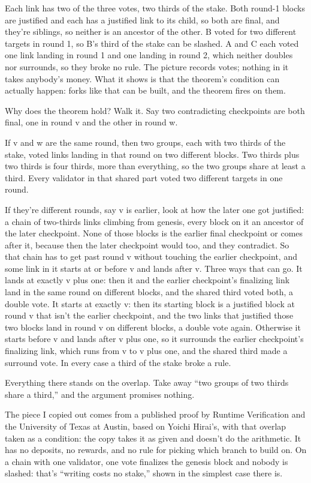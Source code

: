 \documentclass[11pt,twoside]{article}
\theoremstyle{thielethm}
\theoremstyle{thieledef}
\theoremstyle{thieledef}
\theoremstyle{thieledef}
\theoremstyle{thielethm}
\theoremstyle{thieleobs}
\theoremstyle{thielethm}
\begin{document}
Each link has two of the three votes, two thirds of the stake. Both round-1 blocks are justified and each has a justified link to its child, so both are final, and they're siblings, so neither is an ancestor of the other. B voted for two different targets in round 1, so B's third of the stake can be slashed. A and C each voted one link landing in round 1 and one landing in round 2, which neither doubles nor surrounds, so they broke no rule. The picture records votes; nothing in it takes anybody's money. What it shows is that the theorem's condition can actually happen: forks like that can be built, and the theorem fires on them.

Why does the theorem hold? Walk it. Say two contradicting checkpoints are both final, one in round v and the other in round w.

If v and w are the same round, then two groups, each with two thirds of the stake, voted links landing in that round on two different blocks. Two thirds plus two thirds is four thirds, more than everything, so the two groups share at least a third. Every validator in that shared part voted two different targets in one round.

If they're different rounds, say v is earlier, look at how the later one got justified: a chain of two-thirds links climbing from genesis, every block on it an ancestor of the later checkpoint. None of those blocks is the earlier final checkpoint or comes after it, because then the later checkpoint would too, and they contradict. So that chain has to get past round v without touching the earlier checkpoint, and some link in it starts at or before v and lands after v. Three ways that can go. It lands at exactly v plus one: then it and the earlier checkpoint's finalizing link land in the same round on different blocks, and the shared third voted both, a double vote. It starts at exactly v: then its starting block is a justified block at round v that isn't the earlier checkpoint, and the two links that justified those two blocks land in round v on different blocks, a double vote again. Otherwise it starts before v and lands after v plus one, so it surrounds the earlier checkpoint's finalizing link, which runs from v to v plus one, and the shared third made a surround vote. In every case a third of the stake broke a rule.

Everything there stands on the overlap. Take away ``two groups of two thirds share a third,'' and the argument promises nothing.

The piece I copied out comes from a published proof by Runtime Verification and the University of Texas at Austin, based on Yoichi Hirai's, with that overlap taken as a condition: the copy takes it as given and doesn't do the arithmetic. It has no deposits, no rewards, and no rule for picking which branch to build on. On a chain with one validator, one vote finalizes the genesis block and nobody is slashed: that's ``writing costs no stake,'' shown in the simplest case there is.
\end{document}
